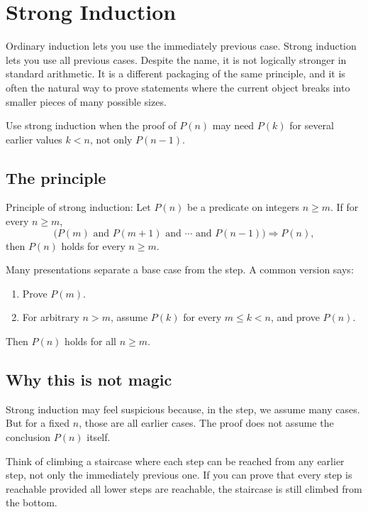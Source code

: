 \newpage
\section{Strong Induction}

Ordinary induction lets you use the immediately previous case. Strong induction lets you use all previous cases. Despite the name, it is not logically stronger in standard arithmetic. It is a different packaging of the same principle, and it is often the natural way to prove statements where the current object breaks into smaller pieces of many possible sizes.

\begin{focusbox}
Use strong induction when the proof of $P(n)$ may need $P(k)$ for several earlier values $k<n$, not only $P(n-1)$.
\end{focusbox}

\subsection{The principle}

\begin{formalbox}
Principle of strong induction: Let $P(n)$ be a predicate on integers $n\geq m$. If for every $n\geq m$,
\[
\bigl(P(m)\text{ and }P(m+1)\text{ and }\cdots\text{ and }P(n-1)\bigr)\Rightarrow P(n),
\]
then $P(n)$ holds for every $n\geq m$.
\end{formalbox}

Many presentations separate a base case from the step. A common version says:

\begin{enumerate}
\item Prove $P(m)$.
\item For arbitrary $n>m$, assume $P(k)$ for every $m\leq k<n$, and prove $P(n)$.
\end{enumerate}

Then $P(n)$ holds for all $n\geq m$.

\subsection{Why this is not magic}

Strong induction may feel suspicious because, in the step, we assume many cases. But for a fixed $n$, those are all earlier cases. The proof does not assume the conclusion $P(n)$ itself.

Think of climbing a staircase where each step can be reached from any earlier step, not only the immediately previous one. If you can prove that every step is reachable provided all lower steps are reachable, the staircase is still climbed from the bottom.

